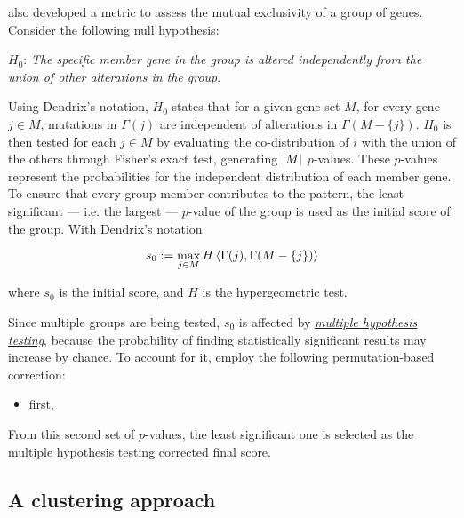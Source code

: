 \textcite{mutex} also developed a metric to assess the mutual exclusivity of a group of genes. Consider the following null hypothesis:

\begin{displayquote}
    $H_0$: \textit{The specific member gene in the group is altered independently from the union of other alterations in the group}.
\end{displayquote}

Using Dendrix's notation, $H_0$ states that for a given gene set $M$, for every gene $j \in M$, mutations in $\Gamma(j)$ are independent of alterations in $\Gamma(M - \{j\})$. $H_0$ is then tested for each $j \in M$ by evaluating the co-distribution of $i$ with the union of the others through Fisher's exact test, generating $\left|M\right|$ $p$-values. These $p$-values represent the probabilities for the independent distribution of each member gene. To ensure that every group member contributes to the pattern, the least significant --- i.e. the largest --- $p$-value of the group is used as the initial score of the group. With Dendrix's notation

\begin{equation}
    s_0 := \max_{j \in M} {H \left\langle\Gamma(j), \Gamma(M - \{j\})\right\rangle}
\end{equation}

where $s_0$ is the initial score, and $H$ is the hypergeometric test.

Since multiple groups are being tested, $s_0$ is affected by \href{https://en.wikipedia.org/wiki/Multiple_comparisons_problem}{\textit{multiple hypothesis testing}}, because the probability of finding statistically significant results may increase by chance. To account for it, \textcite{mutex} employ the following permutation-based correction:

\begin{itemize}
    \item first, 
\end{itemize}

From this second set of $p$-values, the least significant one is selected as the multiple hypothesis testing corrected final score. 

\subsection{A clustering approach} \label{c3_chap2} 

